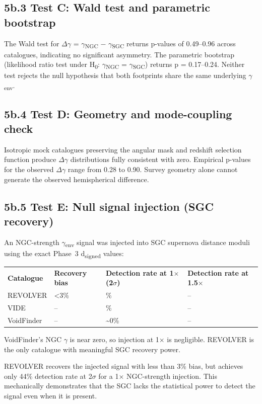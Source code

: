 \documentclass[11pt,a4paper]{article}
\begin{document}
\subsection{5b.3 Test C: Wald test and parametric bootstrap}
The Wald test for $\Delta$$\gamma$ = $\gamma$\textsubscript{NGC} $-$ $\gamma$\textsubscript{SGC} returns p-values of 0.49--0.96 across catalogues, indicating no significant asymmetry. The parametric bootstrap (likelihood ratio test under H\textsubscript{0}: $\gamma$\textsubscript{NGC} = $\gamma$\textsubscript{SGC}) returns p = 0.17--0.24. Neither test rejects the null hypothesis that both footprints share the same underlying $\gamma$\textsubscript{env}.

\subsection{5b.4 Test D: Geometry and mode-coupling check}
Isotropic mock catalogues preserving the angular mask and redshift selection function produce $\Delta$$\gamma$ distributions fully consistent with zero. Empirical p-values for the observed $\Delta$$\gamma$ range from 0.28 to 0.90. Survey geometry alone cannot generate the observed hemispherical difference.

\subsection{5b.5 Test E: Null signal injection (SGC recovery)}
An NGC-strength $\gamma$\textsubscript{env} signal was injected into SGC supernova distance moduli using the exact Phase~3 d\textsubscript{signed} values:

\begin{table}[H]
\centering
\footnotesize
\begin{tabularx}{\linewidth}{l>{\RaggedRight\arraybackslash}X>{\RaggedRight\arraybackslash}X>{\RaggedRight\arraybackslash}X}
\toprule
\textbf{Catalogue} & \textbf{Recovery bias} & \textbf{Detection rate at 1$\times$ (2$\sigma$)} & \textbf{Detection rate at 1.5$\times$} \tabularnewline
REVOLVER & <3\% & 44\% & -- \tabularnewline
VIDE & -- & 16\% & -- \tabularnewline
VoidFinder & -- & \~{}0\% & -- \tabularnewline
\bottomrule
\end{tabularx}
\end{table}

VoidFinder's NGC $\gamma$ is near zero, so injection at 1$\times$ is negligible. REVOLVER is the only catalogue with meaningful SGC recovery power.

REVOLVER recovers the injected signal with less than 3\% bias, but achieves only 44\% detection rate at 2$\sigma$ for a 1$\times$ NGC-strength injection. This mechanically demonstrates that the SGC lacks the statistical power to detect the signal even when it is present.
\end{document}
